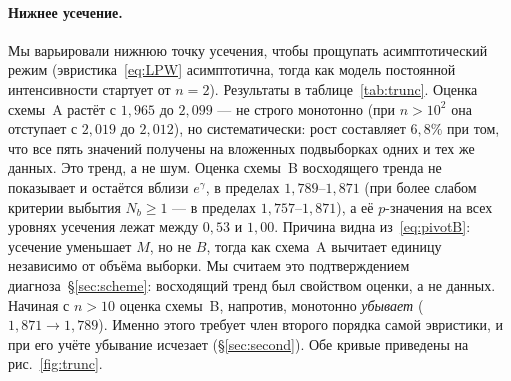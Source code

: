 \documentclass[11pt,a4paper]{article}
\theoremstyle{plain}
\theoremstyle{remark}
\newcommand{\eg}{e^{\gamma}}
\begin{document}
\paragraph{Нижнее усечение.} Мы варьировали нижнюю точку усечения, чтобы прощупать
асимптотический режим (эвристика~\eqref{eq:LPW} асимптотична, тогда как модель
постоянной интенсивности стартует от $n=2$). Результаты в таблице~\ref{tab:trunc}.
Оценка схемы~A растёт с $1{,}965$ до $2{,}099$ --- не строго монотонно (при
$n>10^{2}$ она отступает с $2{,}019$ до $2{,}012$), но систематически: рост
составляет $6{,}8\%$ при том, что все пять значений получены на вложенных
подвыборках одних и тех же данных. Это тренд, а не шум. Оценка схемы~B восходящего
тренда не показывает и остаётся вблизи $\eg$, в пределах $1{,}789$--$1{,}871$ (при
более слабом критерии выбытия $N_b\ge1$ --- в пределах $1{,}757$--$1{,}871$), а её
$p$-значения на всех уровнях усечения лежат между $0{,}53$ и $1{,}00$. Причина видна
из~\eqref{eq:pivotB}: усечение уменьшает $M$, но не $B$, тогда как схема~A
вычитает единицу независимо от объёма выборки. Мы считаем это подтверждением
диагноза~\S\ref{sec:scheme}: восходящий тренд был свойством оценки, а не данных.
Начиная с $n>10$ оценка схемы~B, напротив, монотонно \emph{убывает}
($1{,}871\to1{,}789$). Именно этого требует член второго порядка самой эвристики,
и при его учёте убывание исчезает (\S\ref{sec:second}). Обе кривые приведены на
рис.~\ref{fig:trunc}.
\end{document}
